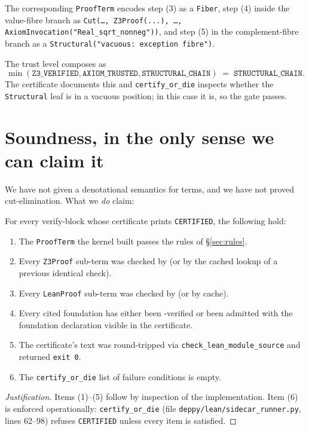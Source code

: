 The corresponding \texttt{ProofTerm} encodes step (3) as a
\texttt{Fiber}, step (4) inside the value-fibre branch as
\texttt{Cut(\dots, \texttt{Z3Proof}(...), \dots, AxiomInvocation("Real\_sqrt\_nonneg"))},
and step (5) in the complement-fibre branch as a
\texttt{Structural("vacuous: exception fibre")}.

The trust level composes as
\[
  \min(\mathtt{Z3\_VERIFIED}, \mathtt{AXIOM\_TRUSTED}, \mathtt{STRUCTURAL\_CHAIN})
  \;=\;\mathtt{STRUCTURAL\_CHAIN}.
\]
The certificate documents this and \texttt{certify\_or\_die}
inspects whether the \texttt{Structural} leaf is in a vacuous
position; in this case it is, so the gate passes.

\section{Soundness, in the only sense we can claim it}
\label{sec:soundness-honest}

We have not given a denotational semantics for \Deppy{} terms, and
we have not proved cut-elimination.  What we \emph{do} claim:

\begin{theorem}
\label{thm:engsound}
For every verify-block whose certificate prints \texttt{CERTIFIED},
the following hold:
\begin{enumerate}[leftmargin=1.7em]
  \item The \texttt{ProofTerm} the kernel built passes the rules of
    \S\ref{sec:rules}.
  \item Every \texttt{Z3Proof} sub-term was checked by \Zthree{} (or
    by the cached lookup of a previous identical check).
  \item Every \texttt{LeanProof} sub-term was checked by \Lean{} (or
    by cache).
  \item Every cited foundation has either been \Zthree-verified or
    been admitted with the foundation declaration visible in the
    certificate.
  \item The certificate's \Lean{} text was round-tripped via
    \texttt{check\_lean\_module\_source} and \Lean{} returned
    \texttt{exit 0}.
  \item The \texttt{certify\_or\_die} list of failure conditions is
    empty.
\end{enumerate}
\end{theorem}

\begin{proof}[Justification]
Items (1)--(5) follow by inspection of the implementation.  Item (6)
is enforced operationally: \texttt{certify\_or\_die} (file
\texttt{deppy/lean/sidecar\_runner.py}, lines 62--98) refuses
\texttt{CERTIFIED} unless every item is satisfied.
\end{proof}

